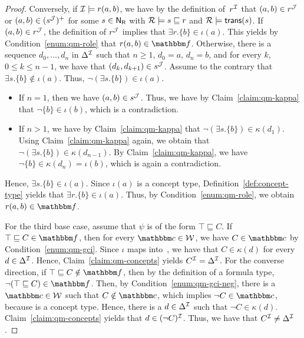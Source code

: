 \begin{proof}
    Conversely, if $\mathcal{I}\models r(a,b)$, we have by the definition of~$r^\mathcal{I}$
    that $(a,b)\in r^\mathcal{J}$ or $(a,b)\in(s^\mathcal{J})^+$ for some $s\in\mathsf{N_R}$ with
    $\mathcal{R}\models s\sqsubseteq r$ and $\mathcal{R}\models\mathsf{trans}(s)$.  If $(a,b)\in
    r^\mathcal{J}$, the definition of $r^\mathcal{J}$ implies that $\exists
    r.\{b\}\in\iota(a)$.  This yields by Condition~\ref{enum:qm-role} that
    $r(a,b)\in\fbb$.
    Otherwise, there is a sequence $d_0,\dots,d_n$ in $\Delta^\mathcal{I}$ such that
    $n\ge 1$, $d_0=a$, $d_n=b$, and for every $k$, $0\le k\le n-1$, we have that
    $(d_k,d_{k+1})\in s^\mathcal{J}$.  Assume to the contrary that $\exists
    s.\{b\}\notin\iota(a)$.  Thus, $\lnot(\exists s.\{b\})\in\iota(a)$.
    \begin{itemize}
        \item If $n=1$, then we have $(a,b)\in s^\mathcal{J}$.  Thus, we have by
            Claim~\ref{claim:qm-kappa} that $\lnot\{b\}\in\iota(b)$, which is a
            contradiction.
        \item If $n>1$, we have by Claim~\ref{claim:qm-kappa} that
            $\lnot(\exists s.\{b\})\in\kappa(d_1)$.  Using
            Claim~\ref{claim:qm-kappa} again, we obtain that $\lnot(\exists
            s.\{b\})\in\kappa(d_{n-1})$.  By Claim~\ref{claim:qm-kappa}, we have
            $\lnot\{b\}\in\kappa(d_n)=\iota(b)$, which is again a contradiction.
    \end{itemize}
    Hence, $\exists s.\{b\}\in\iota(a)$.  Since $\iota(a)$ is a concept type,
    Definition~\ref{def:concept-type} yields that $\exists r.\{b\}\in\iota(a)$.
    Thus, by Condition~\ref{enum:qm-role}, we obtain $r(a,b)\in\fbb$.

    For the third base case, assume that $\psi$ is of the form $\top\sqsubseteq
    C$.  If $\top\sqsubseteq C\in\fbb$, then for every $\cbb\in\Wmc$, we have
    $C\in\cbb$ by Condition~\ref{enum:qm-gci}.  Since $\iota$ maps into~\Wmc, we
    have that $C\in\kappa(d)$ for every $d\in\Delta^\mathcal{I}$.  Hence,
    Claim~\ref{claim:qm-concepts} yields $C^\mathcal{I}=\Delta^\mathcal{I}$.
    For the converse direction, if $\top\sqsubseteq C\notin\fbb$, then by the
    definition of a formula type, $\lnot(\top\sqsubseteq C)\in\fbb$.  Then, by
    Condition~\ref{enum:qm-gci-neg}, there is a $\cbb\in\Wmc$ such that
    $C\notin\cbb$, which implies $\lnot C\in\cbb$, because \cbb is a concept
    type.  Hence, there is a $d\in\Delta^\mathcal{I}$ such that $\lnot C\in\kappa(d)$.
    Claim~\ref{claim:qm-concepts} yields that $d\in(\lnot C)^\mathcal{I}$.  Thus, we
    have that $C^\mathcal{I}\ne\Delta^\mathcal{I}$.


\end{proof}
